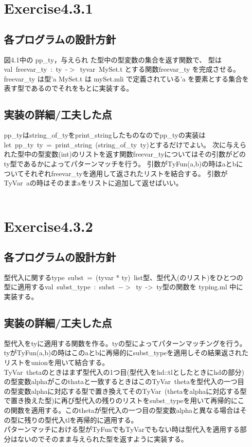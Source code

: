 \documentclass[a4paper,11pt,oneside,openany]{jsarticle}
\begin{document}
\section{Exercise4.3.1}
\subsection{各プログラムの設計方針}
    図4.1中の pp\_ty，与えられ た型中の型変数の集合を返す関数で、
    型は val\ freevar\_ty\ :\ ty\ -$>$\ tyvar\ MySet.t とする関数freevar\_ty を完成させる。freevar\_ty は型'a MySet.t は mySet.mli で定義されている'a を要素とする集合を表す型であるのでそれをもとに実装する。
\subsection{実装の詳細/工夫した点}
    pp\_tyはstring\_of\_tyをprint\_stringしたものなのでpp\_tyの実装はlet\ pp\_ty\ ty\  =\ print\_string\  (string\_of\_ty\ ty)とするだけでよい。
    次に与えられた型中の型変数(int)のリストを返す関数freevar\_tyについてはその引数がどのty型であるかによってパターンマッチを行う。
    引数がTyFun(a,b)の時はaとbについてそれぞれfreevar\_tyを適用して返されたリストを結合する。
    引数がTyVar\ aの時はそのままaをリストに追加して返せばいい。\\\\



\section{Exercise4.3.2}
\subsection{各プログラムの設計方針}
  型代入に関するtype\ subst\ =\ (tyvar * ty)\ list型、型代入(のリスト)をひとつの型に適用するval\ subst\_type\ :\ subst\ $->$\ ty\ ->\ ty型の関数を typing.ml 中に実装する。

\subsection{実装の詳細/工夫した点}
    型代入をtyに適用する関数を作る。tyの型によってパターンマッチングを行う。
    tyがTyFun(a,b)の時はこのaとbに再帰的にsubst\_typeを適用しその結果返されたリストをunionを用いて結合する。\\
    TyVar\ thetaのときはまず型代入の1つ目(型代入をhd::tlとしたときにhdの部分)の型変数alphaがこのthataと一致するときはこのTyVar\ thetaを型代入の一つ目の型変数alphaに対応する型で置き換えてそのTyVar\ (thetaをalphaに対応する型で置き換えた型)に再び型代入の残りのリストをsubst\_typeを用いて再帰的にこの関数を適用する。このthetaが型代入の一つ目の型変数alphaと異なる場合はその型に残りの型代入tlを再帰的に適用する。\\
    パターンマッチにおける型がTyFunでもTyVarでもない時は型代入を適用する部分はないのでそのまま与えられた型を返すように実装する。\\\\
\end{document}
